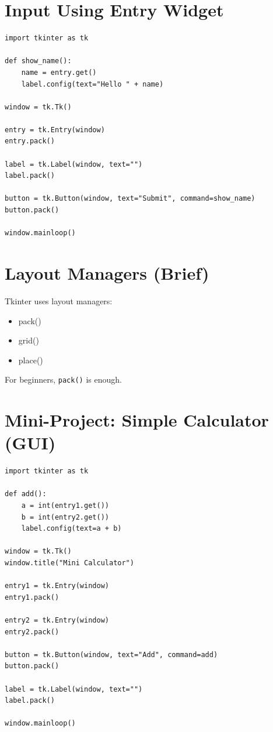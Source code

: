 \section{Input Using Entry Widget}

\begin{verbatim}
import tkinter as tk

def show_name():
    name = entry.get()
    label.config(text="Hello " + name)

window = tk.Tk()

entry = tk.Entry(window)
entry.pack()

label = tk.Label(window, text="")
label.pack()

button = tk.Button(window, text="Submit", command=show_name)
button.pack()

window.mainloop()
\end{verbatim}

\section{Layout Managers (Brief)}

Tkinter uses layout managers:
\begin{itemize}
    \item pack()
    \item grid()
    \item place()
\end{itemize}

For beginners, \texttt{pack()} is enough.

\section{Mini-Project: Simple Calculator (GUI)}

\begin{verbatim}
import tkinter as tk

def add():
    a = int(entry1.get())
    b = int(entry2.get())
    label.config(text=a + b)

window = tk.Tk()
window.title("Mini Calculator")

entry1 = tk.Entry(window)
entry1.pack()

entry2 = tk.Entry(window)
entry2.pack()

button = tk.Button(window, text="Add", command=add)
button.pack()

label = tk.Label(window, text="")
label.pack()

window.mainloop()
\end{verbatim}

